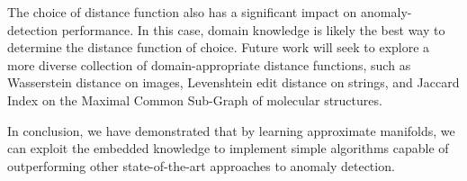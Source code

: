 
The choice of distance function also has a significant impact on anomaly-detection performance.
In this case, domain knowledge is likely the best way to determine the distance function of choice.
Future work will seek to explore a more diverse collection of domain-appropriate distance functions, such as Wasserstein distance on images, Levenshtein edit distance on strings, and Jaccard Index on the Maximal Common Sub-Graph of molecular structures. 


In conclusion, we have demonstrated that by learning approximate manifolds, we can exploit the embedded knowledge to implement simple algorithms capable of outperforming other state-of-the-art approaches to anomaly detection.
